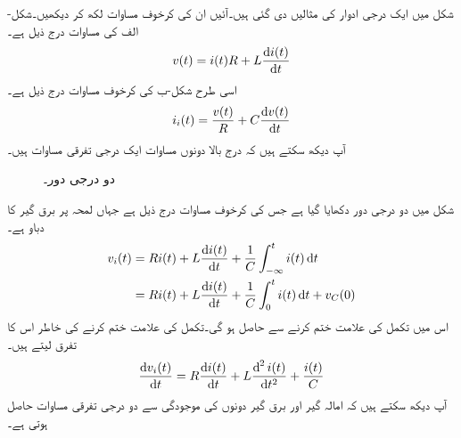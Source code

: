 شکل  میں ایک درجی ادوار کی مثالیں دی گئی ہیں۔آئیں ان کی کرخوف مساوات لکھ کر دیکھیں۔شکل-الف کی مساوات درج ذیل ہے۔
\begin{align}
v(t)=i(t)R+L \frac{\dif i(t)}{\dif t}
\end{align}
اسی طرح شکل-ب کی کرخوف مساوات درج ذیل ہے۔
\begin{align}
i_i(t)=\frac{v(t)}{R}+C\frac{\dif v(t)}{\dif t}
\end{align}
آپ دیکھ سکتے ہیں کہ درج بالا دونوں مساوات ایک درجی تفرقی مساوات ہیں۔

\begin{figure}
\centering
{}
\caption{دو درجی دور۔}
\label{شکل_عارضی_دور_درجی_دور_الف}
\end{figure}

شکل  میں دو درجی دور دکھایا گیا ہے جس کی کرخوف مساوات درج ذیل ہے جہاں  لمحہ  پر برق گیر کا دباو ہے۔
\begin{gather}
\begin{aligned}\label{مساوات_عارضی_تکمل_و_تفرقی_الف}
v_i(t)&=R i(t)+L\frac{\dif i(t)}{\dif t}+\frac{1}{C} \int_{-\infty}^{t}i(t) \dif t\\
&=R i(t)+L\frac{\dif i(t)}{\dif t}+\frac{1}{C} \int_{0}^{t}i(t) \dif t+v_C(0)
\end{aligned}
\end{gather}
اس  میں تکمل کی علامت ختم کرنے سے  حاصل ہو گی۔تکمل کی علامت ختم کرنے کی خاطر اس کا تفرق لیتے ہیں۔
\begin{align}
\frac{\dif v_i(t)}{\dif t}=R \frac{\dif i(t)}{\dif t}+L\frac{\dif^{\,2} i(t)}{\dif t^2}+\frac{i(t)}{C}
\end{align} 
آپ دیکھ سکتے ہیں کہ امالہ گیر اور برق گیر دونوں کی موجودگی سے دو درجی تفرقی مساوات حاصل ہوتی ہے۔

